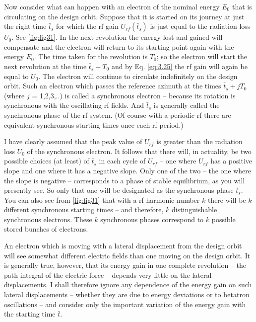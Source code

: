 Now consider what can happen with an electron of the nominal energy $E_0$ that is circulating on the design orbit. Suppose that it is started on its journey at just the right time $\bar{t}_s$ for which the rf gain $U_{rf}(\bar{t}_s)$ is just equal to the radiation loss $U_0$. See \autoref{fig:fig31}. In the next revolution the energy lost and gained will compensate and the electron will return to its starting point again with the energy $E_0$. The time taken for the revolution is $T_0$; so the electron will start the next revolution at the time $\bar{t}_s + T_0$ and by Eq. \eqref{eq:3.25} the rf gain will again be equal to $U_0$. The electron will continue to circulate indefinitely on the design orbit. Such an electron which passes the reference azimuth at the times $\bar{t}_s + jT_0$ (where $j$ = 1,2,3,..) is called a synchronous electron -- because its rotation is synchronous with the oscillating rf fields. And $\bar{t}_s$ is generally called the synchronous phase of the rf system. (Of course with a periodic rf there are equivalent synchronous starting times once each rf period.)

I have clearly assumed that the peak value of $U_{rf}$ is greater than the radiation loss $U_0$ of the synchronous electron. It follows that there will, in actuality, be
two possible choices (at least) of $\bar{t}_s$ in each cycle of $U_{rf}$ -- one where $U_{rf}$ has a positive slope and one where it has a negative slope. Only one of the two -- the one where the slope is negative -- corresponds to a phase of stable equilibrium, as you will presently see. So only that one will be designated as the synchronous phase $\bar{t}_s$. You can also see from \autoref{fig:fig31} that with a rf harmonic number $k$ there will be $k$ different synchronous starting times -- and therefore, $k$ distinguishable synchronous electrons. These $k$ synchronous phases correspond to $k$ possible stored bunches of electrons.

An electron which is moving with a lateral displacement from the design orbit will see somewhat different electric fields than one moving on the design orbit. It is generally true, however, that its energy gain in one complete revolution -- the path integral of the electric force -- depends very little on the lateral displacements. I shall therefore ignore any dependence of the energy gain on such lateral displacements -- whether they are due to energy deviations or to betatron oscillations -- and consider only the important variation of the energy gain with the starting time $\bar{t}$.

